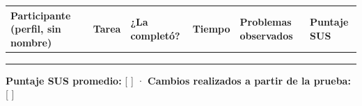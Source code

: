 {\def\LTcaptype{none} %
\begin{longtable}[]{@{}
  >{\raggedright\arraybackslash}p{}
  >{\raggedright\arraybackslash}p{}
  >{\raggedright\arraybackslash}p{}
  >{\raggedright\arraybackslash}p{}
  >{\raggedright\arraybackslash}p{}
  >{\raggedright\arraybackslash}p{}@{}}
\toprule\noalign{}
\begin{minipage}[b]{\linewidth}\raggedright
\textbf{Participante (perfil, sin nombre)}
\end{minipage} & \begin{minipage}[b]{\linewidth}\raggedright
\textbf{Tarea}
\end{minipage} & \begin{minipage}[b]{\linewidth}\raggedright
\textbf{¿La completó?}
\end{minipage} & \begin{minipage}[b]{\linewidth}\raggedright
\textbf{Tiempo}
\end{minipage} & \begin{minipage}[b]{\linewidth}\raggedright
\textbf{Problemas observados}
\end{minipage} & \begin{minipage}[b]{\linewidth}\raggedright
\textbf{Puntaje SUS}
\end{minipage} \\
\midrule\noalign{}
\endhead
\bottomrule\noalign{}
\endlastfoot
& & & & & \\
& & & & & \\
& & & & & \\
\end{longtable}
}

\textbf{Puntaje SUS promedio:} {[} {]} · \textbf{Cambios realizados a
partir de la prueba:} {[} {]}
